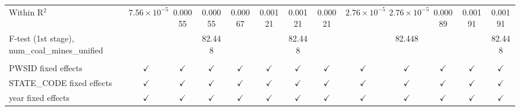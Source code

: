 \begin{table}[htbp]
\begin{adjustbox}{width = \textwidth, center}
\begin{tabular}{lcccccccccccc}
         Within R$^2$                                     & $7.56\times 10^{-5}$  & 0.00055       & 0.00055       & 0.00067       & 0.00121       & 0.00121       & 0.00021       & $2.76\times 10^{-5}$  & $2.76\times 10^{-5}$  & 0.00089       & 0.00191       & 0.00191\\  
         F-test (1st stage), num\_coal\_mines\_unified    &                       &               & 82.448        &               &               & 82.448        &               &                       & 82.448                &               &               & 82.448\\  
          \\
         PWSID fixed effects                              & $\checkmark$          & $\checkmark$  & $\checkmark$  & $\checkmark$  & $\checkmark$  & $\checkmark$  & $\checkmark$  & $\checkmark$          & $\checkmark$          & $\checkmark$  & $\checkmark$  & $\checkmark$\\   
         STATE\_CODE fixed effects                        & $\checkmark$          & $\checkmark$  & $\checkmark$  & $\checkmark$  & $\checkmark$  & $\checkmark$  & $\checkmark$  & $\checkmark$          & $\checkmark$          & $\checkmark$  & $\checkmark$  & $\checkmark$\\   
         year fixed effects                               & $\checkmark$          & $\checkmark$  & $\checkmark$  & $\checkmark$  & $\checkmark$  & $\checkmark$  & $\checkmark$  & $\checkmark$          & $\checkmark$          & $\checkmark$  & $\checkmark$  & $\checkmark$\\   
         \bottomrule
      \end{tabular}
   \end{adjustbox}
\end{table}



